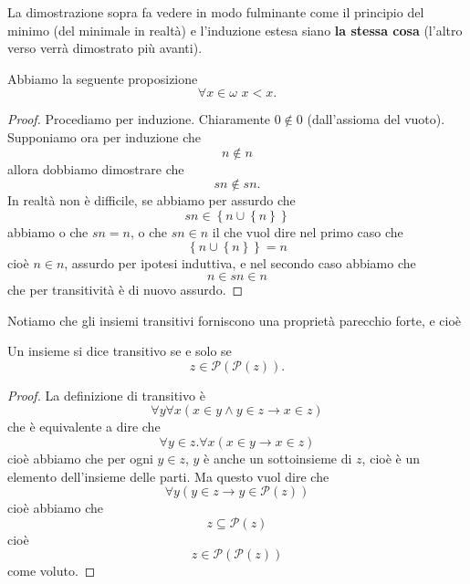 \documentclass[11pt]{scrartcl}
\newcommand{\parti}[1]{\mathcal{P}\!\left(#1\right)}
\begin{document}
 	La dimostrazione sopra fa vedere in modo fulminante come il principio del minimo (del minimale in realtà) e l'induzione estesa siano \textbf{la stessa cosa} (l'altro verso verrà dimostrato più avanti). 
 	\begin{proposition}
 		Abbiamo la seguente proposizione
 		$$\forall x\in \omega\,\,x< x.$$
 	\end{proposition}
 	\begin{proof}
 		Procediamo per induzione. Chiaramente $0\not\in 0$ (dall'assioma del vuoto). Supponiamo ora per induzione che 
 		$$n\not\in n$$
 		allora dobbiamo dimostrare che 
 		$$sn\not\in sn.$$
 		In realtà non è difficile, se abbiamo per assurdo che 
 		$$sn\in \left\{n\cup \left\{n\right\}\right\}$$
 		abbiamo o che $sn=n$, o che $sn\in n$ il che vuol dire nel primo caso che 
 		$$\left\{n\cup \left\{n\right\}\right\}=n$$
 		cioè $n\in n$, assurdo per ipotesi induttiva, e nel secondo caso abbiamo che 
 		$$n\in sn\in n$$
 		che per transitività è di nuovo assurdo.
 	 \end{proof}
 	 Notiamo che gli insiemi transitivi forniscono una proprietà parecchio forte, e cioè
 	 \begin{lemma}
 	 	Un insieme si dice transitivo se e solo se 
 	 	$$z\in \parti{\parti{z}}.$$
 	 \end{lemma}
 	 \begin{proof}
 	 	La definizione di transitivo è
 	 	$$\forall y \forall x\left(x\in y \land y\in z \to x\in z\right)$$
 	 	che è equivalente a dire che 
 	 	$$\forall y\in z.\forall x\left(x\in y \to x\in z\right)$$
 	 	cioè abbiamo che per ogni $y\in z$, $y$ è anche un sottoinsieme di $z$, cioè è un elemento dell'insieme delle parti. Ma questo vuol dire che 
 	 	$$\forall y\left(y\in z \to y\in \parti{z}\right)$$ 
 	 	cioè abbiamo che
 	 	$$z\subseteq \parti{z}$$
 	 	cioè 
 	 	$$z\in \parti{\parti{z}}$$
 	 	come voluto.
 	 \end{proof}
 	
\end{document}
